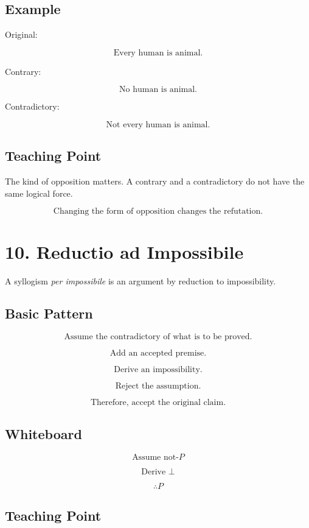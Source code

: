 \documentclass[12pt]{article}
\begin{document}
\subsection*{Example}

Original:

\[
\text{Every human is animal.}
\]

Contrary:

\[
\text{No human is animal.}
\]

Contradictory:

\[
\text{Not every human is animal.}
\]

\subsection*{Teaching Point}

The kind of opposition matters. A contrary and a contradictory do not have the
same logical force.

\[
\boxed{
\text{Changing the form of opposition changes the refutation.}
}
\]

\section*{10. Reductio ad Impossibile}

A syllogism \textit{per impossibile} is an argument by reduction to
impossibility.

\subsection*{Basic Pattern}

\[
\text{Assume the contradictory of what is to be proved.}
\]

\[
\text{Add an accepted premise.}
\]

\[
\text{Derive an impossibility.}
\]

\[
\text{Reject the assumption.}
\]

\[
\text{Therefore, accept the original claim.}
\]

\subsection*{Whiteboard}

\[
\text{Assume not-}P
\]

\[
\text{Derive } \bot
\]

\[
\therefore P
\]

\subsection*{Teaching Point}
\end{document}
